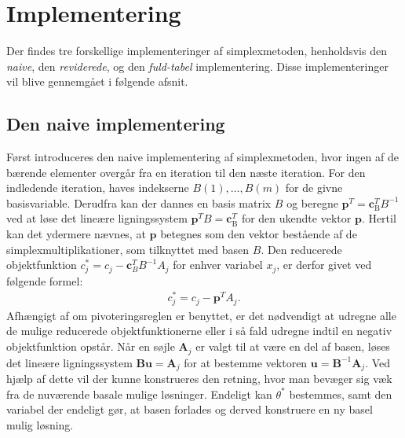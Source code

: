 %
\section{Implementering}
\label{julieergudesmuk}
Der findes tre forskellige implementeringer af simplexmetoden, henholdsvis den \textit{naive}, den \textit{reviderede}, og den \textit{fuld-tabel} implementering. Disse implementeringer vil blive gennemgået i følgende afsnit. 

\subsection{Den naive implementering}
Først introduceres den naive implementering af simplexmetoden, hvor ingen af de bærende elementer overgår fra en iteration til den næste iteration. 
For den indledende iteration, haves indekserne
$B(1),\ldots,B(m)$ for de givne basisvariable. 
Derudfra kan der dannes en basis matrix $B$ og beregne $\mathbf{p}^T=\mathbf{c}_{\text{B}}^T B^{-1}$ ved at løse det lineære ligningssystem $\mathbf{p}^T B=\mathbf{c}_{\text{B}}^T$ for den ukendte vektor $\mathbf{p}$. 
Hertil kan det ydermere nævnes, at $\mathbf{p}$ betegnes som den vektor bestående af de simplexmultiplikationer, som tilknyttet med basen $B$. 
Den reducerede objektfunktion $c_j^* = c_j - \mathbf{c}_B^T B^{-1}A_j$ for enhver variabel $x_j$, er derfor givet ved følgende formel:
%
\begin{align*}
c_j^* = c_j - \mathbf{p}^T A_j.
\end{align*}
%
Afhængigt af om pivoteringsreglen er benyttet, er det nødvendigt at udregne alle de mulige reducerede objektfunktionerne eller i så fald udregne indtil en negativ objektfunktion opstår. Når en søjle $\mathbf{A}_j$ er valgt til at være en del af basen, løses det lineære ligningssystem $\mathbf{Bu}=\mathbf{A}_j$ for at bestemme vektoren $\mathbf{u}=\mathbf{B}^{-1}\mathbf{A}_j$. Ved hjælp af dette vil der kunne konstrueres den retning, hvor man bevæger sig væk fra de nuværende basale mulige løsninger. Endeligt kan $\theta^*$ bestemmes, samt den variabel der endeligt gør, at basen forlades og derved konstruere en ny basel mulig løsning. \\\\
%
